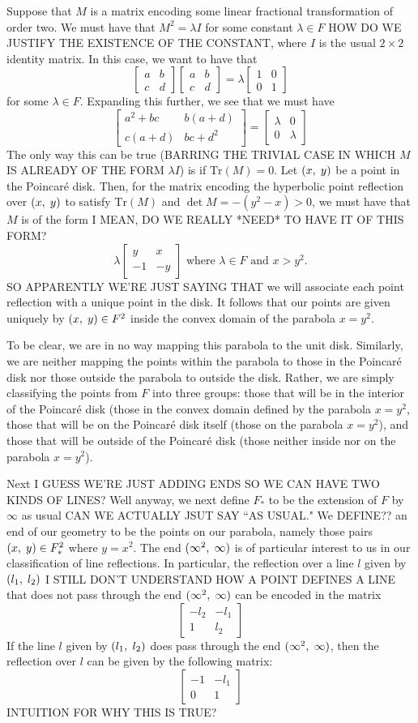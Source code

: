 \documentclass[12pt]{article}
\newcommand{\poincare}{Poincar\'{e} }
\newcommand{\Tr}{\text{Tr}}
\newcommand{\ttc}{, \hspace{1mm}}
\newcommand{\lftmat}[4]{\begin{bmatrix} {#1} & {#2} \\ {#3} & {#4} \end{bmatrix}}
\newcommand{\stanlftmat}{\lftmat{a}{b}{c}{d}}
\newcommand{\pointmat}[2]{\lftmat{{#2}}{{#1}}{-1}{-{#2}}}
\newcommand{\stanpointmat}{\pointmat{x}{y}}
\newcommand{\linenoendmat}[2]{\begin{bmatrix} -{#2} & -{#1} \\ 1 & {#2} \end{bmatrix}}
\newcommand{\stanlinenoendmat}{\linenoendmat{l_1}{l_2}}
\newcommand{\lineendmat}[2]{\begin{bmatrix} -1 & -{#1} \\ 0 & 1 \end{bmatrix}}
\newcommand{\stanlineendmat}{\lineendmat{l_1}{l_2}}
\newcommand{\specialend}{(\infty^2\ttc\infty)}
\begin{document}
Suppose that $M$ is a matrix encoding some linear fractional transformation of order two. We must have that $M^2 = \lambda I$ for some constant $\lambda \in F$ HOW DO WE JUSTIFY THE EXISTENCE OF THE CONSTANT, where $I$ is the usual $2 \times 2$ identity matrix. In this case, we want to have that 
\[\stanlftmat \stanlftmat = \lambda \lftmat{1}{0}{0}{1}\]
for some $\lambda \in F$. Expanding this further, we see that we must have 
\[\lftmat{a^2 + bc}{b(a+d)}{c(a+d)}{bc+d^2} =  \lftmat{\lambda}{0}{0}{\lambda}\]
The only way this can be true (BARRING THE TRIVIAL CASE IN WHICH $M$ IS ALREADY OF THE FORM $\lambda I$) is if $\Tr(M) = 0$. Let $(x \ttc y)$ be a point in the \poincare disk. Then, for the matrix encoding the hyperbolic point reflection over $(x \ttc y)$ to satisfy $\Tr(M)$ and $\det M = -(y^2 - x) > 0$, we must have that $M$ is of the form I MEAN, DO WE REALLY *NEED* TO HAVE IT OF THIS FORM? 
\begin{equation} 
\lambda \stanpointmat \text{ where } \lambda \in F \text{ and } x > y^2. 
\end{equation}	
SO APPARENTLY WE'RE JUST SAYING THAT we will associate each point reflection with a unique point in the disk. It follows that our points are given uniquely by $(x \ttc y) \in F^2$ inside the convex domain of the parabola $x = y^2$.

To be clear, we are in no way mapping this parabola to the unit disk. Similarly, we are neither mapping the points within the parabola to those in the \poincare disk nor those outside the parabola to outside the disk. Rather, we are simply classifying the points from $F$ into three groups: those that will be in the interior of the \poincare disk (those in the convex domain defined by the parabola $x = y^2$, those that will be on the \poincare disk itself (those on the parabola $x = y^2$), and those that will be outside of the \poincare disk (those neither inside nor on the parabola $x = y^2$). 

Next I GUESS WE'RE JUST ADDING ENDS SO WE CAN HAVE TWO KINDS OF LINES? Well anyway, we next define $F_*$ to be the extension of $F$ by $\infty$ as usual CAN WE ACTUALLY JSUT SAY ``AS USUAL." We DEFINE?? an end of our geometry to be the points on our parabola, namely those pairs $(x \ttc y) \in F_*^2$ where $y = x^2$. The end $\specialend$ is of particular interest to us in our classification of line reflections. In particular, the reflection over a line $l$ given by $(l_1\ttc l_2)$ I STILL DON'T UNDERSTAND HOW A POINT DEFINES A LINE that does not pass through the end $\specialend$ can be encoded in the matrix
\[\stanlinenoendmat\]
If the line $l$ given by $(l_1\ttc l_2)$ does pass through the end $\specialend$, then the reflection over $l$ can be given by the following matrix:
\[\stanlineendmat\]
INTUITION FOR WHY THIS IS TRUE?
\end{document}
